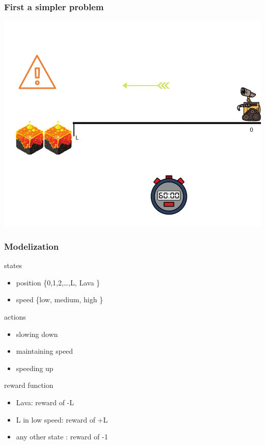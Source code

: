 \documentclass[dvipsnames,svgnames]{beamer}
\begin{document}
\begin{frame}
\frametitle{First a simpler problem}
\begin{center}
\includegraphics[scale=0.4]{img/illustration_lava.png}
\end{center}
\end{frame}

\begin{frame}
\frametitle{Modelization}
\begin{block}{states}
\begin{itemize}
\item  position \{0,1,2,\ldots ,L, Lava  \}
\item  speed    \{low, medium, high   \}
\end{itemize}
\end{block}
\pause
\begin{block}{actions}
\begin{itemize}
\item  slowing down
\item  maintaining speed
\item  speeding up 
\end{itemize}
\end{block}
\pause
\begin{block}{reward function}
\begin{itemize}
\item Lava: reward of -L
\item L in low speed: reward of +L
\item any other state : reward of -1
\end{itemize}
\end{block}

\end{frame}
\end{document}

